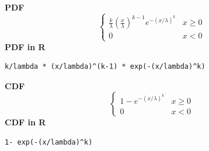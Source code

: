 \smallskip \noindent \hspace{.2cm} \textbf{PDF} 
\begin{equation*}\begin{cases}
\frac{k}{\lambda}\left(\frac{x}{\lambda}\right)^{k-1}e^{-(x/\lambda)^{k}} & x\geq0\\
0 & x<0\end{cases}\end{equation*}
\smallskip \noindent \hspace{.2cm} \textbf{PDF in R}  
\begin{verbatim}k/lambda * (x/lambda)^(k-1) * exp(-(x/lambda)^k)\end{verbatim}
\smallskip \noindent \hspace{.2cm} \textbf{CDF} 
\begin{equation*}\begin{cases}1- e^{-(x/\lambda)^k} & x\geq0\\ 0 & x<0\end{cases}\end{equation*}
\smallskip \noindent \hspace{.2cm} \textbf{CDF in R} 
\begin{verbatim}1- exp(-(x/lambda)^k)\end{verbatim}
%
%
% 
%
%
%
